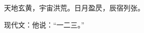 \documentclass[四库全书彩色]{ltc-guji}
\begin{document}
\begin{正文}
天地玄黄，宇宙洪荒。日月盈昃，辰宿列张。

现代文：他说：“一二三。”

\end{正文}
\end{document}
